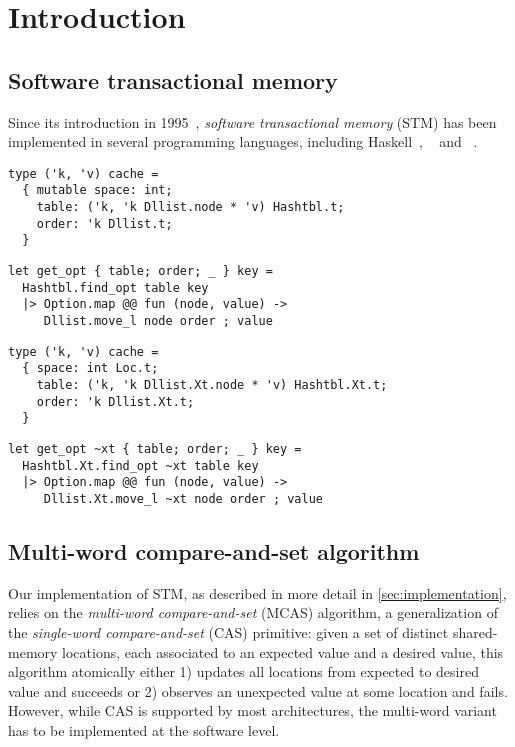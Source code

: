 \section{Introduction}

\subsection{Software transactional memory}

Since its introduction in 1995~\cite{DBLP:conf/podc/ShavitT95}, \emph{software transactional memory} (STM) has been implemented in several programming languages, including Haskell~\cite{DBLP:conf/ppopp/HarrisMPH05}, \Scala~\cite{zio} and \Cpp~\cite{cpp_stm_free}.

\begin{verbatim}
type ('k, 'v) cache =
  { mutable space: int;
    table: ('k, 'k Dllist.node * 'v) Hashtbl.t;
    order: 'k Dllist.t;
  }
\end{verbatim}

\begin{verbatim}
let get_opt { table; order; _ } key =
  Hashtbl.find_opt table key
  |> Option.map @@ fun (node, value) ->
     Dllist.move_l node order ; value
\end{verbatim}

\begin{verbatim}
type ('k, 'v) cache =
  { space: int Loc.t;
    table: ('k, 'k Dllist.Xt.node * 'v) Hashtbl.Xt.t;
    order: 'k Dllist.Xt.t;
  }
\end{verbatim}

\begin{verbatim}
let get_opt ~xt { table; order; _ } key =
  Hashtbl.Xt.find_opt ~xt table key
  |> Option.map @@ fun (node, value) ->
     Dllist.Xt.move_l ~xt node order ; value
\end{verbatim}

\subsection{Multi-word compare-and-set algorithm}

Our implementation of STM, as described in more detail in \cref{sec:implementation}, relies on the \emph{multi-word compare-and-set} (MCAS) algorithm, a generalization of the \emph{single-word compare-and-set} (CAS) primitive: given a set of distinct shared-memory locations, each associated to an expected value and a desired value, this algorithm atomically either 1) updates all locations from expected to desired value and succeeds or 2) observes an unexpected value at some location and fails.
However, while CAS is supported by most architectures, the multi-word variant has to be implemented at the software level.

